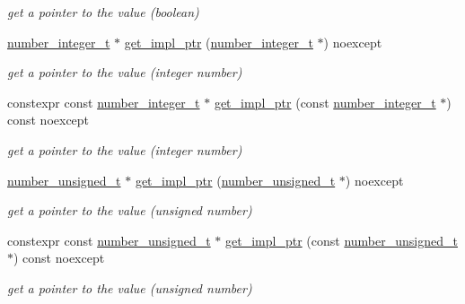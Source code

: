 \begin{DoxyCompactItemize}
\begin{DoxyCompactList}\small\item\em get a pointer to the value (boolean) \end{DoxyCompactList}\item 
\hyperlink{classnlohmann_1_1basic__json_a98e611d67b7bd75307de99c9358ab2dc}{number\+\_\+integer\+\_\+t} $\ast$ \hyperlink{classnlohmann_1_1basic__json_a32a4c3ccdd09b663614adce1834a0a50}{get\+\_\+impl\+\_\+ptr} (\hyperlink{classnlohmann_1_1basic__json_a98e611d67b7bd75307de99c9358ab2dc}{number\+\_\+integer\+\_\+t} $\ast$) noexcept
\begin{DoxyCompactList}\small\item\em get a pointer to the value (integer number) \end{DoxyCompactList}\item 
constexpr const \hyperlink{classnlohmann_1_1basic__json_a98e611d67b7bd75307de99c9358ab2dc}{number\+\_\+integer\+\_\+t} $\ast$ \hyperlink{classnlohmann_1_1basic__json_a0a01103792cc54e9c8236361e5f7ed90}{get\+\_\+impl\+\_\+ptr} (const \hyperlink{classnlohmann_1_1basic__json_a98e611d67b7bd75307de99c9358ab2dc}{number\+\_\+integer\+\_\+t} $\ast$) const noexcept
\begin{DoxyCompactList}\small\item\em get a pointer to the value (integer number) \end{DoxyCompactList}\item 
\hyperlink{classnlohmann_1_1basic__json_ab906e29b5d83ac162e823ada2156b989}{number\+\_\+unsigned\+\_\+t} $\ast$ \hyperlink{classnlohmann_1_1basic__json_aa9aaed6b92909b263e04b5d25eba8d67}{get\+\_\+impl\+\_\+ptr} (\hyperlink{classnlohmann_1_1basic__json_ab906e29b5d83ac162e823ada2156b989}{number\+\_\+unsigned\+\_\+t} $\ast$) noexcept
\begin{DoxyCompactList}\small\item\em get a pointer to the value (unsigned number) \end{DoxyCompactList}\item 
constexpr const \hyperlink{classnlohmann_1_1basic__json_ab906e29b5d83ac162e823ada2156b989}{number\+\_\+unsigned\+\_\+t} $\ast$ \hyperlink{classnlohmann_1_1basic__json_a52d0c7f354c6155221540baef5b98d0a}{get\+\_\+impl\+\_\+ptr} (const \hyperlink{classnlohmann_1_1basic__json_ab906e29b5d83ac162e823ada2156b989}{number\+\_\+unsigned\+\_\+t} $\ast$) const noexcept
\begin{DoxyCompactList}\small\item\em get a pointer to the value (unsigned number) \end{DoxyCompactList}\item 

\end{DoxyCompactItemize}
